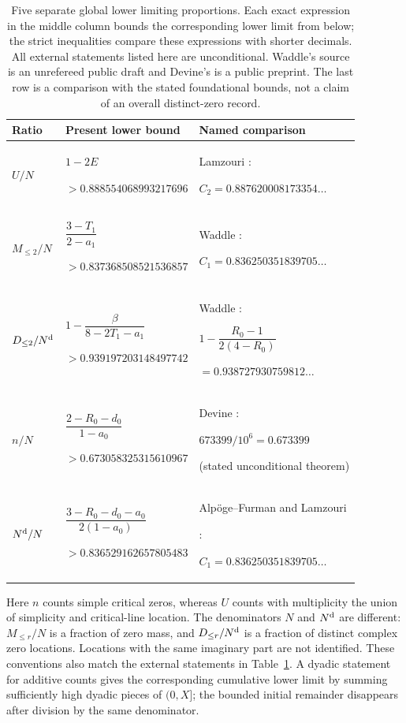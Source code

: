 \begin{table}[ht]
\centering
\small
\setlength{\tabcolsep}{4pt}
\renewcommand{\arraystretch}{1.6}
\begin{tabular}{@{}p{}p{}p{}@{}}
\hline
Ratio & Present lower bound & Named comparison\\
\hline
$U/N$
& $1-2E$\par $>0.888554068993217696$
& Lamzouri \cite{Lamzouri}:\par
  $C_2=0.887620008173354\ldots$\\
$M_{\le2}/N$
& $\dfrac{3-T_1}{2-a_1}$\par $>0.837368508521536857$
& Waddle \cite{Waddle}:\par
  $C_1=0.836250351839705\ldots$\\
$D_{\le2}/N^{\rm d}$
& $1-\dfrac{\beta}{8-2T_1-a_1}$\par $>0.939197203148497742$
& Waddle \cite{Waddle}:\par
  $1-\dfrac{R_0-1}{2(4-R_0)}$\par
  $=0.938727930759812\ldots$\\
$n/N$
& $\dfrac{2-R_0-d_0}{1-a_0}$\par $>0.673058325315610967$
& Devine \cite{Devine}:\par
  $673399/10^6=0.673399$\par
  (stated unconditional theorem)\\
$N^{\rm d}/N$
& $\dfrac{3-R_0-d_0-a_0}{2(1-a_0)}$\par $>0.836529162657805483$
& Alp\"oge--Furman and Lamzouri\par
  \cite{AF,Lamzouri}:\par
  $C_1=0.836250351839705\ldots$\\
\hline
\end{tabular}
\caption{Five separate global lower limiting proportions. Each exact
expression in the middle column bounds the corresponding lower limit
from below; the strict inequalities compare these expressions with
shorter decimals. All external statements listed here are unconditional.
Waddle's source is an unrefereed public draft and Devine's is a public
preprint. The last row is a comparison with the stated foundational
bounds, not a claim of an overall distinct-zero record.}
\label{tab:literaturecomparison}
\end{table}

Here $n$ counts simple critical zeros, whereas $U$ counts with
multiplicity the union of simplicity and critical-line location.
The denominators $N$ and $N^{\rm d}$ are different: $M_{\le r}/N$
is a fraction of zero mass, and $D_{\le r}/N^{\rm d}$ is a fraction
of distinct complex zero locations. Locations with the same imaginary
part are not identified. These conventions also match the external
statements in Table~\ref{tab:literaturecomparison}. A dyadic statement
for additive counts gives the corresponding cumulative lower limit by
summing sufficiently high dyadic pieces of $(0,X]$; the bounded initial
remainder disappears after division by the same denominator.

